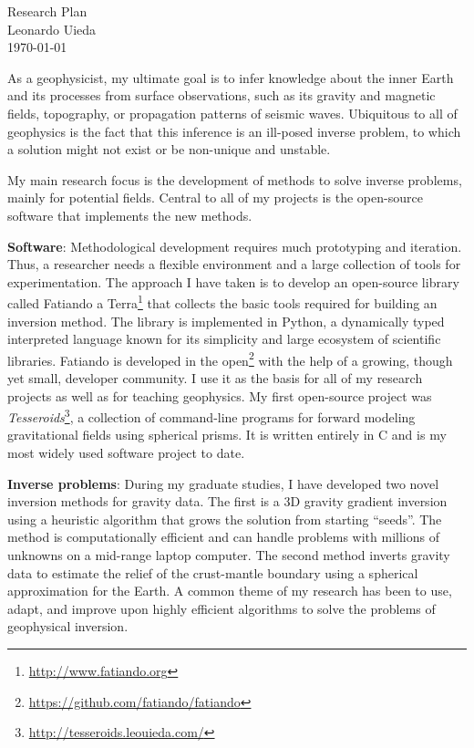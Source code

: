 \documentclass[12pt,notitlepage]{article}
\begin{document}
\begin{center}
    {\huge Research Plan}
    \\[0.2in]
    {Leonardo Uieda}
    \\[0.1in]
    {\small \today}
\end{center}


As a geophysicist,
my ultimate goal is
to infer knowledge about the inner Earth
and its processes
from surface observations,
such as its gravity and magnetic fields,
topography,
or propagation patterns of seismic waves.
%
Ubiquitous to all of geophysics
is the fact that this inference
is an ill-posed inverse problem,
to which a solution might not exist
or be non-unique and unstable.


My main research focus is
the development of methods
to solve inverse problems,
mainly for potential fields.
%
Central to all of my projects
is the open-source software
that implements the new methods.


\textbf{Software}:
Methodological development requires
much prototyping and iteration.
%
Thus,
a researcher needs
a flexible environment
and a large collection of tools
for experimentation.
%
The approach I have taken is
to develop an open-source library
called Fatiando a Terra\footnote{\url{http://www.fatiando.org}}
that collects the basic tools
required for building an inversion method.
%
The library is implemented in Python,
a dynamically typed interpreted language
known for its simplicity
and large ecosystem of scientific libraries.
%
Fatiando is developed in the
open\footnote{\url{https://github.com/fatiando/fatiando}}
with the help of a growing, though yet small,
developer community.
%
I use it as the basis for
all of my research projects
as well as for teaching geophysics.
%
My first open-source project
was \textit{Tesseroids}\footnote{\url{http://tesseroids.leouieda.com/}},
a collection of command-line programs
for forward modeling gravitational fields
using spherical prisms.
%
It is written entirely in C
and is my most widely used software project to date.


\textbf{Inverse problems}:
During my graduate studies,
I have developed two novel inversion methods
for gravity data.
%
The first is a 3D gravity gradient inversion
using a heuristic algorithm
that grows the solution from starting ``seeds''.
%
The method is computationally efficient
and can handle problems with millions of unknowns
on a mid-range laptop computer.
%
The second method inverts gravity data
to estimate the relief
of the crust-mantle boundary
using a spherical approximation for the Earth.
%
A common theme of my research has been
to use, adapt, and improve upon
highly efficient algorithms
to solve the problems of geophysical inversion.
\end{document}
